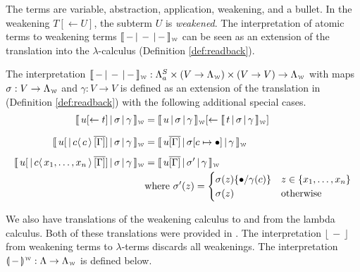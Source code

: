\documentclass[a4paper,UKenglish,cleveref, autoref]{lipics-v2019}
\newcommand{\FALC}{\Lambda^{S}_{a}}
\newcommand{\WEAK}{\Lambda_{\weaksymbol}}
\newcommand{\set}[1]{ \{ #1 \} }
\newcommand{\share}[3]{#1 [#2 \leftarrow #3]}
\newcommand{\dist}[5]{#1 [ #2 \, \vert \, \fakedist{#4}{#5} \, #3 ]}
\newcommand{\fakedist}[2]{#1 \langle \, #2 \, \rangle}
\newcommand{\sub}[3]{#1 \{ #2 / #3 \}}
\newcommand{\weaksymbol}{\mbox{\tiny $\mathcal{W}$}}
\newcommand{\readweakwmap}[3]{\llbracket \, #1 \, \vert \, #2 \, \vert \, #3  \, \rrbracket_{\weaksymbol} }
\newcommand{\compweak}[1]{\llparenthesis \, #1 \, \rrparenthesis^{\weaksymbol}}
\newcommand{\readbackweak}[1]{\lfloor \, #1 \, \rfloor}
\begin{document}
The terms are variable, abstraction, application, weakening, and a bullet. In the weakening $\share{T}{}{U}$, the subterm $U$ is \emph{weakened}. The interpretation of atomic terms to weakening terms $\readweakwmap{-}{-}{-}$ can be seen as an extension of the translation into the $\lambda$-calculus (Definition \ref{def:readback}).

\begin{definition}
\label{def:transfalcweak}
	The interpretation $\readweakwmap{-}{-}{-} : \FALC \times (V \rightarrow \WEAK) \times (V \rightarrow V) \rightarrow \WEAK$ with maps $\sigma : V \rightarrow \WEAK$ and $\gamma : V \rightarrow V$ is defined as an extension of the translation in (Definition \ref{def:readback}) with the following additional special cases.
	\begin{align*}
		\readweakwmap{\share{u}{}{t}}{\sigma}{\gamma} &= \share{\readweakwmap{u}{\sigma}{\gamma}}{}{\readweakwmap{t}{\sigma}{\gamma}} \\[0.2cm]
		\readweakwmap{\dist{u}{}{\overline{[\Gamma]}}{c}{c}}{\sigma}{\gamma} &= \readweakwmap{u \overline{[\Gamma]}}{\sigma[c \mapsto \bullet]}{\gamma} \\[0.2cm]
		\readweakwmap{\dist{u}{}{\overline{[\Gamma]}}{c}{x_{1}, \dots, x_{n}}}{\sigma}{\gamma} &= \readweakwmap{u \overline{[\Gamma]}}{\sigma'}{\gamma} \\
		& \text{where } \sigma'(z) = \begin{cases} \sigma(z) \sub{}{\bullet}{\gamma(c)} & z \in \set{x_{1}, \dots, x_{n}} \\ \sigma(z) & \text{otherwise} \end{cases} \\
	\end{align*}
\end{definition}

\noindent We also have translations of the weakening calculus to and from the lambda calculus. Both of these translations were provided in \cite{Gundersen-Heijltjes-Parigot-2013-LICS}. The interpretation $\readbackweak{-}$ from weakening terms to $\lambda$-terms discards all weakenings. The interpretation $\compweak{-} : \Lambda \rightarrow \WEAK$ is defined below.
\end{document}
